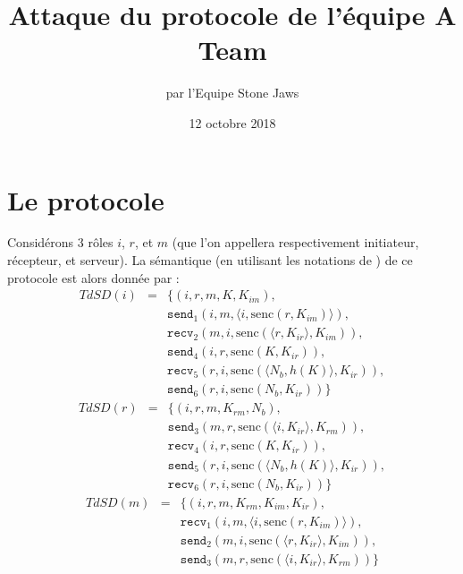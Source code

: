 \documentclass[a4paper,10pt]{article}
\title{Attaque du protocole de l'équipe A Team}
\author{par l'Equipe Stone Jaws}
\date{12 octobre 2018}
\begin{document}
\maketitle

\section{Le protocole}

Considérons 3 rôles $i$, $r$, et $m$ (que l'on appellera respectivement initiateur, récepteur, et serveur). La sémantique (en utilisant les notations de \cite{cas}) de ce protocole est alors donnée par :
\begin{eqnarray*}
	TdSD(i) & = & \{ (i,r,m, K, K_{im}), \\
		& & \texttt{send}_1(i,m, \langle i, \textrm{senc}(r,K_{im})\rangle ),\\
		& & \texttt{recv}_2(m,i,\textrm{senc}(\langle r, K_{ir} \rangle,K_{im})),\\
		& & \texttt{send}_4(i,r,\textrm{senc}(K, K_{ir})),\\
		& & \texttt{recv}_5(r,i,\textrm{senc}(\langle N_b, h(K) \rangle, K_{ir})),\\
		& & \texttt{send}_6(r,i,\textrm{senc}(N_b, K_{ir}))\}
\end{eqnarray*}
\begin{eqnarray*}
	TdSD(r) & = & \{ (i,r,m, K_{rm}, N_b), \\
		& & \texttt{send}_3(m,r,\textrm{senc}(\langle i, K_{ir} \rangle,K_{rm}) ),\\
		& & \texttt{recv}_4(i,r,\textrm{senc}(K, K_{ir})),\\
		& & \texttt{send}_5(r,i,\textrm{senc}(\langle N_b, h(K) \rangle, K_{ir})),\\
		& & \texttt{recv}_6(r,i,\textrm{senc}(N_b, K_{ir}))\}
\end{eqnarray*}
\begin{eqnarray*}
	TdSD(m) & = & \{ (i,r,m, K_{rm}, K_{im}, K_{ir}), \\
		& & \texttt{recv}_1(i,m, \langle i, \textrm{senc}(r,K_{im})\rangle ),\\
		& & \texttt{send}_2(m,i,\textrm{senc}(\langle r, K_{ir} \rangle,K_{im}) ),\\
		& & \texttt{send}_3(m,r,\textrm{senc}(\langle i, K_{ir} \rangle,K_{rm}) )\}
\end{eqnarray*}
\end{document}

